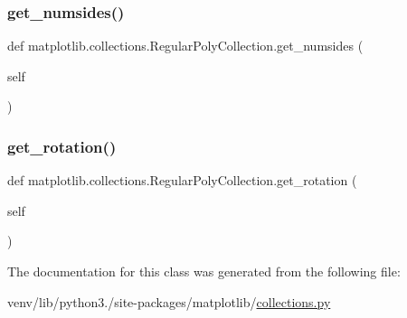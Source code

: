 \subsubsection{\texorpdfstring{get\+\_\+numsides()}{get\_numsides()}}
{\footnotesize\ttfamily def matplotlib.\+collections.\+Regular\+Poly\+Collection.\+get\+\_\+numsides (\begin{DoxyParamCaption}\item[{}]{self }\end{DoxyParamCaption})}

\mbox{\label{classmatplotlib_1_1collections_1_1RegularPolyCollection_ae7d6c7b3db17710c52c9f6733cd3b649}} 
\subsubsection{\texorpdfstring{get\+\_\+rotation()}{get\_rotation()}}
{\footnotesize\ttfamily def matplotlib.\+collections.\+Regular\+Poly\+Collection.\+get\+\_\+rotation (\begin{DoxyParamCaption}\item[{}]{self }\end{DoxyParamCaption})}



The documentation for this class was generated from the following file\+:\begin{DoxyCompactItemize}
\item 
venv/lib/python3./site-\/packages/matplotlib/\hyperlink{collections_8py}{collections.\+py}\end{DoxyCompactItemize}
